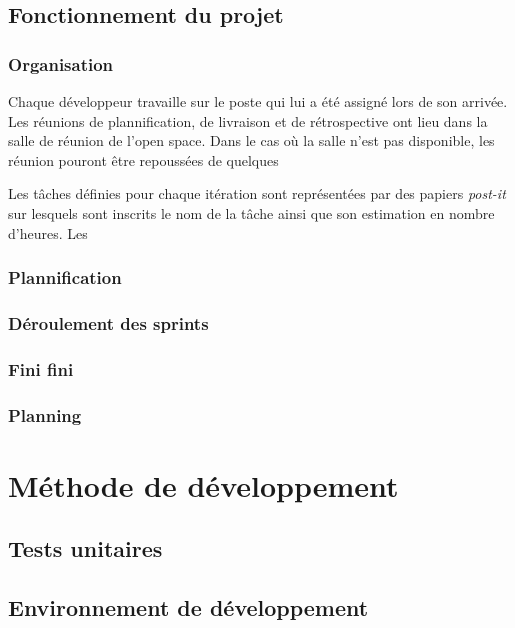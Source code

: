 \documentclass[11pt]{article}
\begin{document}
\subsection{Fonctionnement du projet}

\subsubsection{Organisation}

Chaque développeur travaille sur le poste qui lui a été assigné lors de son
arrivée. Les réunions de plannification, de livraison et de rétrospective
ont lieu dans la salle de réunion de l'open space. Dans le cas où la salle
n'est pas disponible, les réunion pouront être repoussées de quelques 

Les tâches définies pour chaque itération sont représentées par des papiers
\emph{post-it} sur lesquels sont inscrits le nom de la tâche ainsi que son
estimation en nombre d'heures. Les 

\subsubsection{Plannification}

\subsubsection{Déroulement des sprints}

\subsubsection{Fini fini}

\subsubsection{Planning}

\section{Méthode de développement}

\subsection{Tests unitaires}

\subsection{Environnement de développement}
\end{document}
